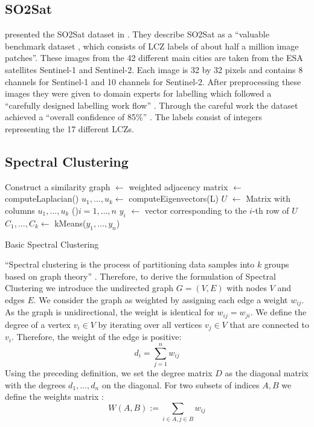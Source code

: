 \subsection{SO2Sat}
\label{subsec:so2sat}
\citeauthor{zhu_so2sat_2019} presented the SO2Sat dataset in \cite{zhu_so2sat_2019}.
They describe SO2Sat as a \enquote{valuable benchmark dataset \textelp{}, which consists of \gls{LCZ} labels of about half a million \textelp{} image patches}.
These images from the 42 different main cities are taken from the \gls{ESA} satellites Sentinel-1 and Sentinel-2. Each image is 32 by 32 pixels and contains 8 channels for Sentinel-1 and 10 channels for Sentinel-2.
After preprocessing these images they were given to domain experts for labelling which followed a \enquote{carefully designed labelling work flow} \cite{zhu_so2sat_2019}.
Through the careful work the dataset achieved a \enquote{overall confidence of 85\%} \cite{zhu_so2sat_2019}.
The labels consist of integers representing the 17 different \glspl{LCZ}.

\subsection{Spectral Clustering}
\label{subsec:spectral_clustering}

\begin{algorithm}[b]
  Construct a similarity graph\;
  \Adj \(\leftarrow\) weighted adjacency matrix\;
  \Laplace \(\leftarrow\) computeLaplacian(\Adj)\;
  \(u_1, \ldots, u_k \leftarrow\) computeEigenvectors(L)\;
  \(U\) \(\leftarrow\) Matrix with columns \(u_1, \ldots, u_k\)\;
  \ForEach(){\(i = 1, \ldots, n\)}{
    \(y_i\) \(\leftarrow\) vector corresponding to the \(i\)-th row of \(U\)
  }
\(C_1, \ldots, C_k \leftarrow\) kMeans(\(y_1, \ldots, y_n\))\;

  \caption{Basic Spectral Clustering}\label{alg:basic_spectral}
 \end{algorithm}

\enquote{Spectral clustering is the process of partitioning data samples into
\(k\) groups based on graph theory} \cite{krajsek_helmholtz_nodate}. Therefore,
to derive the formulation of Spectral Clustering we introduce the undirected graph \(G=(V, E)\) with nodes \(V\) and edges \(E\).
We consider the graph as weighted by assigning each edge a weight \(w_{ij}\). As the graph
is unidirectional, the weight is identical for \(w_{ij} = w_{ji} \).
We define the degree of a vertex \(v_i \in V\) by iterating over all vertices \(v_j \in V\) that are connected to \(v_i\).
Therefore, the weight of the edge is positive:
\[d_i = \sum_{j=1}^n w_{ij}\]
Using the preceding definition, we set the degree matrix \(D\) as the diagonal matrix with the degrees \(d_1, \ldots, d_n\) on the diagonal.
\cite{von_luxburg_tutorial_2007}
For two subsets of indices \(A, B\) we define the weights matrix \cite{von_luxburg_tutorial_2007}:
\[W(A, B) := \sum_{i \in A, j \in B} w_{ij}\]


